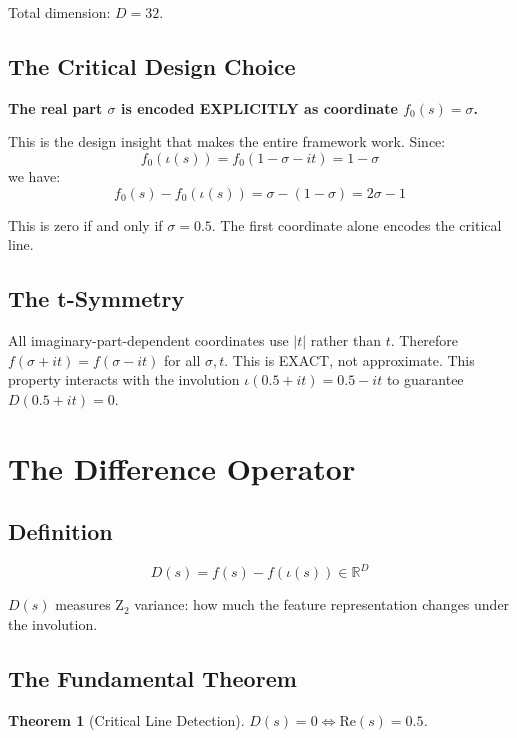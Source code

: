 \documentclass[11pt]{article}
\newtheorem{theorem}{Theorem}[section]
\begin{document}
Total dimension: $D = 32$.

\subsection{The Critical Design Choice}

\textbf{The real part $\sigma$ is encoded EXPLICITLY as coordinate $f_0(s) = \sigma$.}

This is the design insight that makes the entire framework work. Since:
$$f_0(\iota(s)) = f_0(1 - \sigma - it) = 1 - \sigma$$
we have:
$$f_0(s) - f_0(\iota(s)) = \sigma - (1 - \sigma) = 2\sigma - 1$$

This is zero if and only if $\sigma = 0.5$. The first coordinate alone encodes the critical line.

\subsection{The t-Symmetry}

All imaginary-part-dependent coordinates use $|t|$ rather than $t$. Therefore $f(\sigma + it) = f(\sigma - it)$ for all $\sigma, t$. This is EXACT, not approximate. This property interacts with the involution $\iota(0.5 + it) = 0.5 - it$ to guarantee $D(0.5 + it) = 0$.

\newpage
\section{The Difference Operator}
\label{sec:diff}

\subsection{Definition}

\begin{equation}
D(s) = f(s) - f(\iota(s)) \in \mathbb{R}^D
\end{equation}

$D(s)$ measures Z$_2$ variance: how much the feature representation changes under the involution.

\subsection{The Fundamental Theorem}

\begin{theorem}[Critical Line Detection]
$D(s) = 0 \iff \mathrm{Re}(s) = 0.5$.
\end{theorem}
\end{document}
